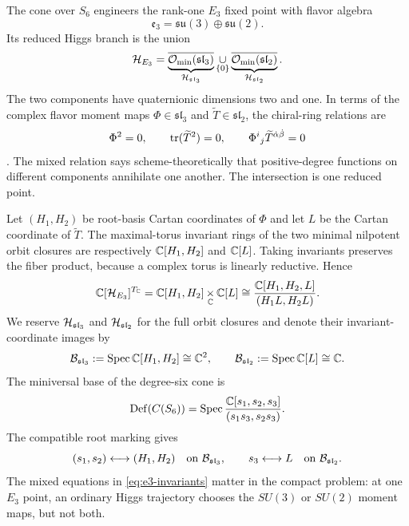 The cone over $S_6$ engineers the rank-one $E_3$ fixed point with flavor
algebra
\begin{equation}
 \mathfrak e_3=\mathfrak{su}(3)\oplus\mathfrak{su}(2).
\end{equation}
Its reduced Higgs branch is the union
\begin{equation}
 \mathcal H_{E_3}
 =\underbrace{\overline{\mathcal O_{\min}(\mathfrak{sl}_3)}}_
 {\mathcal H_{\mathfrak{sl}_3}}
 \mathop{\cup}_{\{0\}}
 \underbrace{\overline{\mathcal O_{\min}(\mathfrak{sl}_2)}}_
 {\mathcal H_{\mathfrak{sl}_2}} .
 \label{eq:e3-components}
\end{equation}
The two components have quaternionic dimensions two and one. In terms of the
complex flavor moment maps
$\Phi\in\mathfrak{sl}_3$ and
$\widetilde T\in\mathfrak{sl}_2$, the chiral-ring relations are
\begin{equation}
 \Phi^2=0,
 \qquad
 \operatorname{tr}(\widetilde T^2)=0,
 \qquad
 \Phi^i{}_j\widetilde T^{\dot\alpha\dot\beta}=0
 \label{eq:e3-chiral-relations}
\end{equation}
\cite{Cremonesi:2015lsa}. The mixed relation says scheme-theoretically that
positive-degree functions on different components annihilate one another.
The intersection is one reduced point.

Let $(H_1,H_2)$ be root-basis Cartan coordinates of $\Phi$ and let $L$ be
the Cartan coordinate of $\widetilde T$. The maximal-torus invariant rings of
the two minimal nilpotent orbit closures are respectively
$\mathbb C[H_1,H_2]$ and $\mathbb C[L]$. Taking invariants preserves the fiber product,
because a complex torus is linearly reductive. Hence
\begin{equation}
 \mathbb C[\mathcal H_{E_3}]^{T_{\mathbb C}}
 =\mathbb C[H_1,H_2]\mathop{\times}_{\mathbb C}\mathbb C[L]
 \cong\frac{\mathbb C[H_1,H_2,L]}{(H_1L,H_2L)}.
 \label{eq:e3-invariants}
\end{equation}
We reserve $\mathcal H_{\mathfrak{sl}_3}$ and $\mathcal H_{\mathfrak{sl}_2}$ for the full
orbit closures and denote their invariant-coordinate images by
\begin{equation}
 \mathcal B_{\mathfrak{sl}_3}:=\operatorname{Spec}\mathbb C[H_1,H_2]\cong\mathbb C^2,
 \qquad
 \mathcal B_{\mathfrak{sl}_2}:=\operatorname{Spec}\mathbb C[L]\cong\mathbb C.
 \label{eq:e3-invariant-images}
\end{equation}
The miniversal base of the degree-six cone is
\begin{equation}
 \operatorname{Def}(C(S_6))
 =\operatorname{Spec}\frac{\mathbb C[s_1,s_2,s_3]}{(s_1s_3,s_2s_3)}.
 \label{eq:e3-altmann}
\end{equation}
The compatible root marking gives
\begin{equation}
 (s_1,s_2)\longleftrightarrow(H_1,H_2)
 \quad\text{on }\mathcal B_{\mathfrak{sl}_3},
 \qquad
 s_3\longleftrightarrow L
 \quad\text{on }\mathcal B_{\mathfrak{sl}_2}.
 \label{eq:e3-dictionary}
\end{equation}
The mixed equations in \eqref{eq:e3-invariants} matter in the compact
problem: at one $E_3$ point, an ordinary Higgs trajectory chooses the
$SU(3)$ or $SU(2)$ moment maps, but not both.

